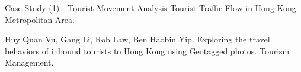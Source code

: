 \documentclass[
 size=14pt,
 paper=smartboard,  %
 mode=present, 		%
 display=slides, 	%
 pauseslide,
 fleqn,leqno]{powerdot}{}
\begin{document}
\begin{slide}[toc=,bm=]{Case Study (1) - Tourist Movement Analysis}
Tourist Traffic Flow in Hong Kong Metropolitan Area.

\begin{figure}[htbp]
\end{figure}
\begin{thebibliography}{1*}
\small{Huy Quan Vu, Gang Li, Rob Law, Ben Haobin Yip.
Exploring the travel behaviors of inbound tourists to Hong Kong using Geotagged photos.
Tourism Management.}
\end{thebibliography}
\end{slide}


%
%
\end{document}
